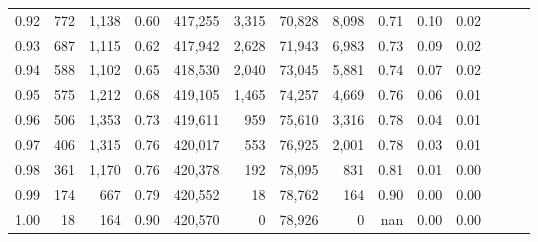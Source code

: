 \begin{tabular}{rrrrrrrrrrrrrr}
0.92 &    772 &  1,138 &  0.60 &  417,255 &    3,315 &  70,828 &   8,098 &  0.71 &  0.10 &      0.02 \\
0.93 &    687 &  1,115 &  0.62 &  417,942 &    2,628 &  71,943 &   6,983 &  0.73 &  0.09 &      0.02 \\
0.94 &    588 &  1,102 &  0.65 &  418,530 &    2,040 &  73,045 &   5,881 &  0.74 &  0.07 &      0.02 \\
0.95 &    575 &  1,212 &  0.68 &  419,105 &    1,465 &  74,257 &   4,669 &  0.76 &  0.06 &      0.01 \\
0.96 &    506 &  1,353 &  0.73 &  419,611 &      959 &  75,610 &   3,316 &  0.78 &  0.04 &      0.01 \\
0.97 &    406 &  1,315 &  0.76 &  420,017 &      553 &  76,925 &   2,001 &  0.78 &  0.03 &      0.01 \\
0.98 &    361 &  1,170 &  0.76 &  420,378 &      192 &  78,095 &     831 &  0.81 &  0.01 &      0.00 \\
0.99 &    174 &    667 &  0.79 &  420,552 &       18 &  78,762 &     164 &  0.90 &  0.00 &      0.00 \\
1.00 &     18 &    164 &  0.90 &  420,570 &        0 &  78,926 &       0 &   nan &  0.00 &      0.00 \\
\bottomrule
\end{tabular}
